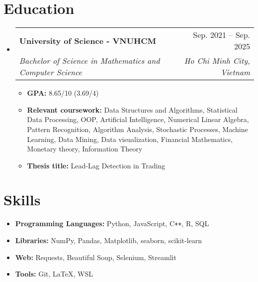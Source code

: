 \documentclass[letterpaper,11pt]{article}
\makeatletter
\newcommand{\heading}[4]{
    \normalsize
    \begin{tabular*}{0.97\textwidth}[t]{l@{\extracolsep{\fill}}r}
      \textbf{#1} & #2 \\[-2pt]
      \textit{\small#3} & \textit{\small #4}
    \end{tabular*}
    \vspace{-2pt}
}
\makeatother
\begin{document}
\section{Education}
\begin{itemize}
    \item \heading{University of Science - VNUHCM}{Sep. 2021 -- Sep. 2025}
      {Bachelor of Science in Mathematics and Computer Science}{Ho Chi Minh City, Vietnam}
    \begin{itemize}
        \item \textbf{GPA:} 8.65/10 (3.69/4)
        \item \textbf{Relevant coursework:}
        Data Structures and Algorithms, 
        Statistical Data Processing, 
        OOP, %
        Artificial Intelligence,
        Numerical Linear Algebra,
        Pattern Recognition,
        Algorithm Analysis,
        Stochastic Processes,
        Machine Learning,
        Data Mining,
        Data visualization,
        Financial Mathematics, 
        Monetary theory,
        Information Theory
        \item \textbf{Thesis title:} Lead-Lag Detection in Trading
    \end{itemize}
\end{itemize}


\section{Skills}
\begin{itemize}
    \item \textbf{Programming Languages:} 
    Python, 
    JavaScript, 
    C\texttt{++},
    R, 
    SQL
    
    \item \textbf{Libraries:} 
    NumPy, Pandas, Matplotlib, 
    seaborn, 
    scikit-learn
    
    \item \textbf{Web:} 
    Requests, 
    Beautiful Soup, 
    Selenium, 
    Streamlit


    \item \textbf{Tools:} 
    Git, 
    LaTeX, 
    WSL 

\end{itemize}
\end{document}
